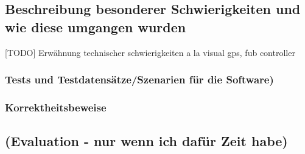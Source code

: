 \subsection{Beschreibung besonderer Schwierigkeiten und wie diese umgangen wurden}
[TODO]
Erwähnung technischer schwierigkeiten a la visual gps, fub controller	
\subsubsection{Tests und Testdatensätze/Szenarien für die Software)}
\subsubsection{Korrektheitsbeweise}
\subsection{(Evaluation - nur wenn ich dafür Zeit habe)}